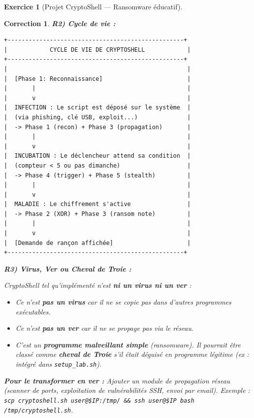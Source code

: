 \documentclass[a4paper,11pt]{article}
\theoremstyle{plain}
\newtheorem{correction}{Correction}
\theoremstyle{definition}
\newtheorem{exercice}{Exercice}
\begin{document}
\begin{exercice}[Projet CryptoShell --- Ransomware éducatif]
\begin{correction}
\medskip
\textbf{R2) Cycle de vie :}
\begin{lstlisting}[numbers=none,frame=none,backgroundcolor=\color{white},language={}]
+--------------------------------------------------+
|            CYCLE DE VIE DE CRYPTOSHELL            |
+--------------------------------------------------+
|                                                   |
|  [Phase 1: Reconnaissance]                        |
|       |                                           |
|       v                                           |
|  INFECTION : Le script est déposé sur le système  |
|  (via phishing, clé USB, exploit...)              |
|  -> Phase 1 (recon) + Phase 3 (propagation)       |
|       |                                           |
|       v                                           |
|  INCUBATION : Le déclencheur attend sa condition  |
|  (compteur < 5 ou pas dimanche)                   |
|  -> Phase 4 (trigger) + Phase 5 (stealth)         |
|       |                                           |
|       v                                           |
|  MALADIE : Le chiffrement s'active                |
|  -> Phase 2 (XOR) + Phase 3 (ransom note)         |
|       |                                           |
|       v                                           |
|  [Demande de rançon affichée]                     |
+--------------------------------------------------+
\end{lstlisting}

\medskip
\textbf{R3) Virus, Ver ou Cheval de Troie :}

CryptoShell tel qu'implémenté n'est \textbf{ni un virus ni un ver} :
\begin{itemize}
    \item Ce n'est \textbf{pas un virus} car il ne se copie pas dans d'autres programmes exécutables.
    \item Ce n'est \textbf{pas un ver} car il ne se propage pas via le réseau.
    \item C'est un \textbf{programme malveillant simple} (ransomware). Il pourrait être classé comme \textbf{cheval de Troie} s'il était déguisé en programme légitime (ex : intégré dans \texttt{setup\_lab.sh}).
\end{itemize}

\textbf{Pour le transformer en ver :} Ajouter un module de propagation réseau (scanner de ports, exploitation de vulnérabilités SSH, envoi par email). Exemple : \texttt{scp cryptoshell.sh user@\$IP:/tmp/ \&\& ssh user@\$IP bash /tmp/cryptoshell.sh}.


\end{correction}
\end{exercice}
\end{document}
